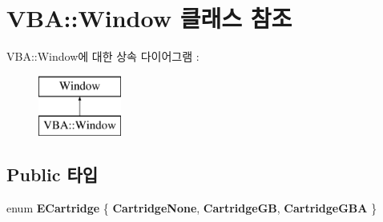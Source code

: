 \hypertarget{class_v_b_a_1_1_window}{}\section{V\+BA\+:\+:Window 클래스 참조}
\label{class_v_b_a_1_1_window}
V\+BA\+:\+:Window에 대한 상속 다이어그램 \+: \begin{figure}[H]
\begin{center}
\leavevmode
\includegraphics[height=2.000000cm]{class_v_b_a_1_1_window}
\end{center}
\end{figure}
\subsection*{Public 타입}
\begin{DoxyCompactItemize}
\item 
\mbox{\label{class_v_b_a_1_1_window_af580451d3ee7a738a73434858a08fa65}} 
enum {\bfseries E\+Cartridge} \{ {\bfseries Cartridge\+None}, 
{\bfseries Cartridge\+GB}, 
{\bfseries Cartridge\+G\+BA}
 \}
\end{DoxyCompactItemize}
